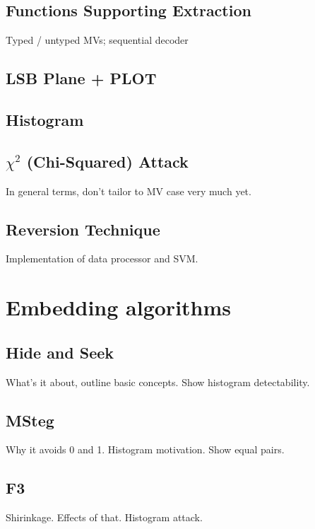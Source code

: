 \documentclass[12pt,british,twoside,notitlepage,usenames,dvipsnames,hypens,final]{report}
\numberwithin{equation}{section}
\numberwithin{figure}{section}
\begin{document}
\subsection{Functions Supporting Extraction}

Typed / untyped MVs; sequential decoder

\subsection{LSB Plane + PLOT}

\subsection{Histogram}

\subsection{$\chi^2$ (Chi-Squared) Attack}

In general terms, don't tailor to MV case very much yet.

\subsection{Reversion Technique}
Implementation of data processor and SVM.

\section{Embedding algorithms}
\label{emb-alg}

\subsection{Hide and Seek}

What's it about, outline basic concepts. Show histogram detectability.

\subsection{MSteg}

Why it avoids 0 and 1. Histogram motivation. Show equal pairs.

\subsection{F3}

Shirinkage. Effects of that. Histogram attack.
\end{document}
